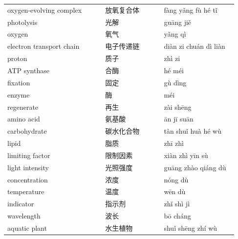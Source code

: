 \documentclass[11pt]{article}
\begin{document}
\begin{longtable}{@{}p{0.40\linewidth}p{0.24\linewidth}p{0.30\linewidth}@{}}
oxygen-evolving complex & 放氧复合体 & fàng yǎng fù hé tǐ \\
photolysis & 光解 & guāng jiě \\
oxygen & 氧气 & yǎng qì \\
electron transport chain & 电子传递链 & diàn zi chuán dì liàn \\
proton & 质子 & zhì zi \\
ATP synthase & 合酶 & hé méi \\
fixation & 固定 & gù dìng \\
enzyme & 酶 & méi \\
regenerate & 再生 & zài shēng \\
amino acid & 氨基酸 & ān jī suān \\
carbohydrate & 碳水化合物 & tàn shuǐ huà hé wù \\
lipid & 脂质 & zhī zhì \\
limiting factor & 限制因素 & xiàn zhì yīn sù \\
light intensity & 光照强度 & guāng zhào qiáng dù \\
concentration & 浓度 & nóng dù \\
temperature & 温度 & wēn dù \\
indicator & 指示剂 & zhǐ shì jì \\
wavelength & 波长 & bō cháng \\
aquatic plant & 水生植物 & shuǐ shēng zhí wù \\
\end{longtable}
\end{document}
